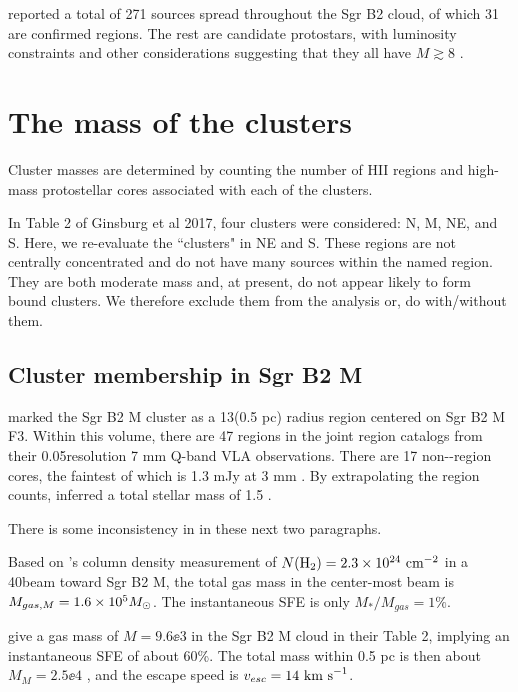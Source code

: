 \documentclass[twocolumn]{aastex61}
\begin{document}
\citet{Ginsburg2018a} reported a total of 271 sources spread throughout the Sgr
B2 cloud, of which 31 are confirmed \hii regions.  The rest are candidate
protostars, with luminosity constraints and other considerations suggesting
that they all have $M\gtrsim8$ \msun.


\section{The mass of the clusters}
Cluster masses are determined by counting the number of HII regions and high-mass
protostellar cores associated with each of the clusters.

In Table 2 of Ginsburg et al 2017, four clusters were considered: N, M, NE, and
S.  Here, we re-evaluate the ``clusters" in NE and S.  These regions are not
centrally concentrated and do not have many sources within the named region.
They are both moderate mass and, at present, do not appear likely to form bound
clusters.  We therefore exclude them from the analysis {\color{red} or, do with/without
them}.



\subsection{Cluster membership in Sgr B2 M}
\citet{Schmiedeke2016a} marked the Sgr B2 M cluster as a 13\arcsec  (0.5 pc) radius
region centered on Sgr B2 M F3.  Within this volume, there are 47 \hii regions
in the joint  \hii region catalogs \citep{Gaume1995a,De-Pree2015a} from their
0.05\arcsec resolution 7 mm Q-band
VLA observations.  There are 17 non-\hii-region cores, the faintest of which is
1.3 mJy at 3 mm \citep{Ginsburg2018a}.  By extrapolating the \hii region counts,
\citet{Ginsburg2018a} inferred a total stellar mass of 1.5 \msun.

{\color{red} There is some inconsistency in \citet{Schmiedeke2016a} in these
next two paragraphs.}

Based on \citet{Schmiedeke2016a}'s column density measurement of
$N(\textrm{H}_{2})=2.3\times10^{24}~\textrm{cm}^{-2}$
in a 40\arcsec beam toward Sgr B2 M,
the total gas mass in the center-most beam is $M_{gas, M} = 1.6\times10^{5} M_{\odot}$.
The instantaneous SFE is only $M_*/M_{gas}=1\%$.

\citet{Schmiedeke2016a} give a gas mass of $M=9.6\ee{3}$ \msun in the Sgr B2 M
cloud in their Table 2, implying an instantaneous SFE of about 60\%.  The total
mass within 0.5 pc is then about $M_M = 2.5\ee{4}$ \msun, and the escape speed
is $v_{esc}=14~\textrm{km~s}^{-1}$.
\end{document}
